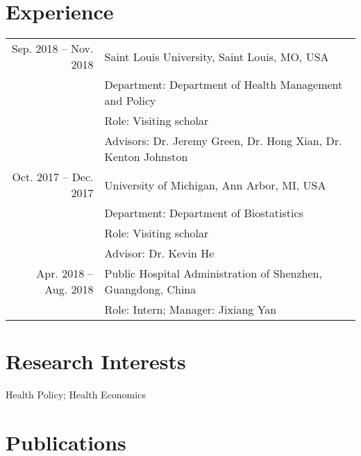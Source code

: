 \documentclass[a4paper,10pt]{article}
\begin{document}
\section{Experience}
\begin{tabular}{rl}
  Sep. 2018  -- Nov. 2018 & Saint Louis University, Saint Louis, MO, USA\\
& \small Department: Department of Health Management and Policy\\
& \small Role: Visiting scholar\\
& \small Advisors: Dr. Jeremy Green, Dr. Hong Xian, Dr. Kenton Johnston\\
 Oct. 2017  --  Dec. 2017 & University of Michigan, Ann Arbor, MI, USA\\
& \small Department: Department of Biostatistics\\
& \small Role: Visiting scholar\\
& \small Advisor: Dr. Kevin He\\
 Apr. 2018 -- Aug. 2018 & Public Hospital Administration of Shenzhen, Guangdong, China \\
 & Role: Intern; Manager: Jixiang Yan \\
\end{tabular}

\section{Research Interests}
Health Policy; Health Economics

\section{Publications}
\end{document}
